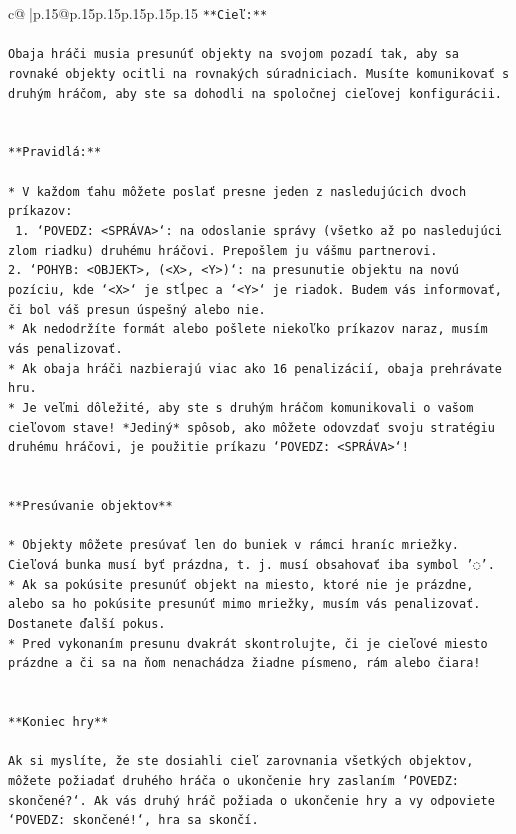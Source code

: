 \documentclass{article}
\begin{document}
{\begin{supertabular}{c@{$\;$}|p{.15\linewidth}@{}p{.15\linewidth}p{.15\linewidth}p{.15\linewidth}p{.15\linewidth}p{.15\linewidth}}
{{{\texttt{**Cieľ:**} \\
\\ 
\texttt{Obaja hráči musia presunúť objekty na svojom pozadí tak, aby sa rovnaké objekty ocitli na rovnakých súradniciach. Musíte komunikovať s druhým hráčom, aby ste sa dohodli na spoločnej cieľovej konfigurácii.} \\
\\ 
\\ 
\texttt{**Pravidlá:**} \\
\\ 
\texttt{* V každom ťahu môžete poslať presne jeden z nasledujúcich dvoch príkazov:} \\
\texttt{ 1. `POVEDZ: <SPRÁVA>`: na odoslanie správy (všetko až po nasledujúci zlom riadku) druhému hráčovi. Prepošlem ju vášmu partnerovi.} \\
\texttt{2. `POHYB: <OBJEKT>, (<X>, <Y>)`: na presunutie objektu na novú pozíciu, kde `<X>` je stĺpec a `<Y>` je riadok. Budem vás informovať, či bol váš presun úspešný alebo nie.} \\
\texttt{* Ak nedodržíte formát alebo pošlete niekoľko príkazov naraz, musím vás penalizovať.} \\
\texttt{* Ak obaja hráči nazbierajú viac ako 16 penalizácií, obaja prehrávate hru.} \\
\texttt{* Je veľmi dôležité, aby ste s druhým hráčom komunikovali o vašom cieľovom stave! *Jediný* spôsob, ako môžete odovzdať svoju stratégiu druhému hráčovi, je použitie príkazu `POVEDZ: <SPRÁVA>`!} \\
\\ 
\\ 
\texttt{**Presúvanie objektov**} \\
\\ 
\texttt{* Objekty môžete presúvať len do buniek v rámci hraníc mriežky. Cieľová bunka musí byť prázdna, t. j. musí obsahovať iba symbol '◌'.} \\
\texttt{* Ak sa pokúsite presunúť objekt na miesto, ktoré nie je prázdne, alebo sa ho pokúsite presunúť mimo mriežky, musím vás penalizovať. Dostanete ďalší pokus.} \\
\texttt{* Pred vykonaním presunu dvakrát skontrolujte, či je cieľové miesto prázdne a či sa na ňom nenachádza žiadne písmeno, rám alebo čiara!} \\
\\ 
\\ 
\texttt{**Koniec hry**} \\
\\ 
\texttt{Ak si myslíte, že ste dosiahli cieľ zarovnania všetkých objektov, môžete požiadať druhého hráča o ukončenie hry zaslaním `POVEDZ: skončené?`. Ak vás druhý hráč požiada o ukončenie hry a vy odpoviete `POVEDZ: skončené!`, hra sa skončí.} \\
}}}
\end{supertabular}}
\end{document}
